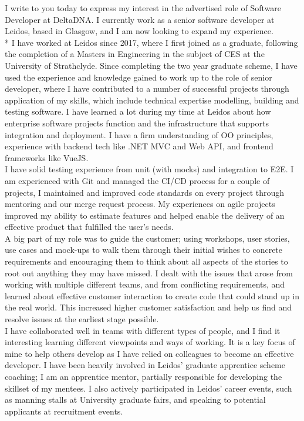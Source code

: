 \documentclass[11pt]{letter} %
\newcommand\tab[1][1cm]{\hspace*{#1}}
\begin{document}
\begin{letter}{}
	I write to you today to express my interest in the advertised role of Software Developer at DeltaDNA. I currently work as a senior software developer at Leidos, based in Glasgow, and I am now looking to expand my experience.\\*
\tab	 I have worked at Leidos since 2017, where I first joined as a graduate, following the completion of a Masters in Engineering in the subject of CES at the University of Strathclyde. Since completing the two year graduate scheme, I have used the experience and knowledge gained to work up to the role of senior developer, where I have contributed to a number of successful projects through application of my skills, which include technical expertise modelling, building and testing software. I have learned a lot during my time at Leidos about how enterprise software projects function and the infrastructure that supports integration and deployment. I have a firm understanding of OO principles, experience with backend tech like .NET MVC and Web API, and frontend frameworks like VueJS.\\
\tab	I have solid testing experience from unit (with mocks) and integration to E2E. I am experienced with Git and managed the CI/CD process for a couple of projects, I maintained and improved code standards on every project through mentoring and our merge request process. My experiences on agile projects improved my ability to estimate features and helped enable the delivery of an effective product that fulfilled the user’s needs.\\
\tab	A big part of my role was to guide the customer; using workshops, user stories, use cases and mock-ups to walk them through their initial wishes to concrete requirements and encouraging them to think about all aspects of the stories to root out anything they may have missed. I dealt with the issues that arose from working with multiple different teams, and from conflicting requirements, and learned about effective customer interaction to create code that could stand up in the real world. This increased higher customer satisfaction and help us find and resolve issues at the earliest stage possible.\\
\tab	I have collaborated well in teams with different types of people, and I find it interesting learning different viewpoints and ways of working. It is a key focus of mine to help others develop as I have relied on colleagues to become an effective developer. I have been heavily involved in Leidos’ graduate apprentice scheme coaching; I am an apprentice mentor, partially responsible for developing the skillset of my mentees. I also actively participated in Leidos’ career events, such as manning stalls at University graduate fairs, and speaking to potential applicants at recruitment events. \\

\end{letter}
\end{document}
